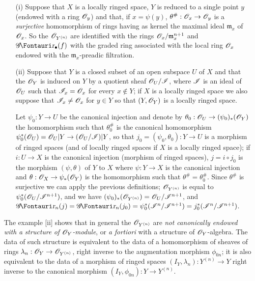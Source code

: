 \begin{examples}[16.1.3]
\label{IV.16.1.3}
\begin{enumerate}
  \item[(i)] Suppose that $X$ is a locally ringed space, $Y$ is reduced to a single point $y$ (endowed with a ring $\mathscr{O}_y$) and that, if $x = \psi(y)$, $\theta^\#:\sh{O}_x \to \sh{O}_y$ is a \emph{surjective} homomorphism of rings having as kernel the maximal ideal $\mathfrak{m}_x$ of $\mathscr{O}_x$.
  So the $\mathscr{O}_{Y^{(n)}}$ are identified with the rings $\mathscr{O}_x/\mathfrak{m}_x^{n+1}$ and $\shGr_\bullet(f)$ with the graded ring associated with the local ring $\mathscr{O}_x$ endowed with the $\mathfrak{m}_x$-preadic filtration.
  \item[(ii)] Suppose that $Y$ is a closed subset of an open subspace $U$ of $X$ and that the $\mathscr{O}_Y$ is induced on $Y$ by a quotient sheaf $\mathscr{O}_U/\mathscr{I}$, where $\mathscr{I}$ is an ideal of $\mathscr{O}_U$ such that $\mathscr{I}_x = \mathscr{O}_x$ for every $x \not\in Y$;
  if $X$ is a locally ringed space we also suppose that $\mathscr{I}_x \neq \mathscr{O}_x$ for $y \in Y$ so that $(Y, \mathscr{O}_Y)$ is a locally ringed space.
  
  Let $\psi_0: Y \to U$ be the canonical injection and denote by $\theta_0: \sh{O}_U \to (\psi_0)_*(\sh{O}_Y)$ the homomorphism such that $\theta_0^\#$ is the canonical homomorphism $\psi^*_0(\sh{O}_U) = \sh{O}_U|Y \to (\sh{O}_U/\sh{I})|Y$, so that $j_0=(\psi_0, \theta_0):Y \to U$ is a morphism of ringed spaces (and of locally ringed spaces if $X$ is a locally ringed space);
  if $i:U \to X$ is the canonical injection (morphism of ringed spaces), $j = i\circ j_0$ is the morphism $(\psi, \theta)$ of $Y$ to $X$ where $\psi: Y \to X$ is the canonical injection and $\theta:\sh{O}_X \to \psi_*(\sh{O}_Y)$ is the homomorphism such that $\theta^\# = \theta_0^\#$.
  Since $\theta^\#$ is surjective we can apply the previous definitions;
  $\mathscr{O}_{Y^{(n)}}$ is equal to $\psi^*_0(\mathscr{O}_U/\mathscr{I}^{n+1})$, and we have $(\psi_0)_*(\mathscr{O}_{Y^{(n)}} ) = \mathscr{O}_U/\mathscr{I}^{n+1}$, and $\shGr_n(j) = \shGr_n(j_0) = \psi^*_0(\sh{I}^n/\sh{I}^{n+1}) = j^*_0(\sh{I}^n/\sh{I}^{n+1})$.
\end{enumerate}
\end{examples}

\begin{env}[16.1.4]
\label{IV.16.1.4}
The example [ii] shows that in general the $\mathscr{O}_{Y^{(n)}}$ are \emph{not canonically endowed with a structure of $\mathscr{O}_Y$-module}, or \emph{a fortiori} with a structure of $\mathscr{O}_Y$-algebra.
The data of such structure is equivalent to the data of a homomorphism of sheaves of rings $\lambda_n:\sh{O}_Y \to \sh{O}_{Y^{(n)}}$, right inverse to the augmentation morphism $\phi_{0n}$;
it is also equivalent to the data of a morphism of ringed spaces $(I_Y, \lambda_n): Y^{(n)} \to Y$ right inverse to the canonical morphism $(I_Y, \phi_{0n}): Y \to Y^{(n)}$.
\end{env}

